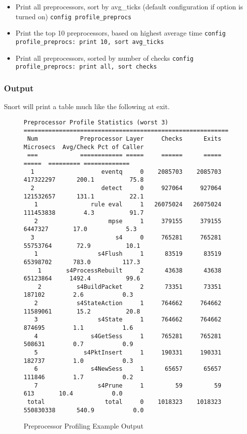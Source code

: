 \documentclass[english]{report}
\begin{document}
\begin{itemize}
\item Print all preprocessors, sort by avg\_ticks (default configuration if option is turned on)
\subitem \texttt{config profile\_preprocs}
\item Print the top 10 preprocessors, based on highest average time
\subitem \texttt{config profile\_preprocs: print 10, sort avg\_ticks}
\item Print all preprocessors, sorted by number of checks
\subitem \texttt{config profile\_preprocs: print all, sort checks}
\end{itemize}

\subsubsection{Output}

Snort will print a table much like the following at exit.
\begin{figure}[!hbpt]
\footnotesize{
\begin{verbatim}
Preprocessor Profile Statistics (worst 3)
==========================================================
 Num            Preprocessor Layer     Checks      Exits           Microsecs  Avg/Check Pct of Caller
 ===            ============ =====     ======      =====               =====  ========= =============
  1                   eventq     0    2085703    2085703           417322297      200.1          75.8
  2                   detect     0     927064     927064           121532657      131.1          22.1
   1               rule eval     1   26075024   26075024           111453838        4.3          91.7
   2                    mpse     1     379155     379155             6447327       17.0           5.3
  3                       s4     0     765281     765281            55753764       72.9          10.1
   1                 s4Flush     1      83519      83519            65398702      783.0         117.3
    1       s4ProcessRebuilt     2      43638      43638            65123864     1492.4          99.6
    2          s4BuildPacket     2      73351      73351              187102        2.6           0.3
   2           s4StateAction     1     764662     764662            11589061       15.2          20.8
   3                 s4State     1     764662     764662              874695        1.1           1.6
   4               s4GetSess     1     765281     765281              508631        0.7           0.9
   5             s4PktInsert     1     190331     190331              182737        1.0           0.3
   6               s4NewSess     1      65657      65657              111846        1.7           0.2
   7                 s4Prune     1         59         59                 613       10.4           0.0
 total                 total     0    1018323    1018323           550830338      540.9           0.0
\end{verbatim}
}
\caption{\label{preprocessor profiling example output}Preprocessor Profiling Example Output}
\end{figure}
\end{document}
